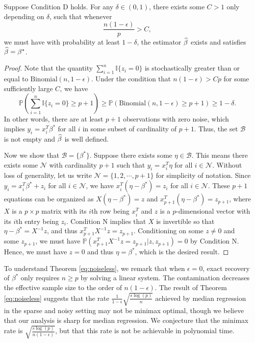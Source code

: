 \begin{thm}\label{eq:noiseless}
Suppose Condition D holds. For any $\delta\in(0,1)$, there exists some $C>1$ only depending on $\delta$, such that whenever
$$\frac{n(1-\epsilon)}{p}>C,$$
we must have with probability at least $1-\delta$, the estimator $\widehat{\beta}$ exists and satisfies $\widehat{\beta}=\beta^*$.
\end{thm}
\begin{proof}
Note that the quantity $\sum_{i=1}^n\mathbb{I}\{z_i=0\}$ is stochastically greater than or equal to $\text{Binomial}(n,1-\epsilon)$. Under the condition that $n(1-\epsilon)>Cp$ for some sufficiently large $C$, we have
$$\mathbb{P}\left(\sum_{i=1}^n\mathbb{I}\{z_i=0\}\geq p+1\right)\geq \mathbb{P}\left(\text{Binomial}(n,1-\epsilon)\geq p+1\right)\geq 1-\delta.$$
In other words, there are at least $p+1$ observations with zero noise, which implies $y_i=x_i^T\beta^*$ for all $i$ in some subset of cardinality of $p+1$. Thus, the set $\mathcal{B}$ is not empty and $\widehat{\beta}$ is well defined.

Now we show that $\mathcal{B}=\{\beta^*\}$. Suppose there exists some $\eta\in\mathcal{B}$. This means there exists some $\mathcal{N}$ with cardinality $p+1$ such that $y_i=x_i^T\eta$ for all $i\in\mathcal{N}$. Without loss of generality, let us write $\mathcal{N}=\{1,2,\cdots,p+1\}$ for simplicity of notation. Since $y_i=x_i^T\beta^*+z_i$ for all $i\in\mathcal{N}$, we have $x_i^T(\eta-\beta^*)=z_i$ for all $i\in\mathcal{N}$. These $p+1$ equations can be organized as $X(\eta-\beta^*)=z$ and $x_{p+1}^T(\eta-\beta^*)=z_{p+1}$, where $X$ is a $p\times p$ matrix with its $i$th row being $x_i^T$ and $z$ is a $p$-dimensional vector with its $i$th entry being $z_i$. Condition N implies that $X$ is invertible so that $\eta-\beta^*=X^{-1}z$, and thus $x_{p+1}^TX^{-1}z=z_{p+1}$. Conditioning on some $z\neq 0$ and some $z_{p+1}$, we must have $\mathbb{P}\left(x_{p+1}^TX^{-1}z=z_{p+1}|z,z_{p+1}\right)=0$ by Condition N. Hence, we must have $z=0$ and thus $\eta=\beta^*$, which is the desired result.
\end{proof}

To understand Theorem \ref{eq:noiseless}, we remark that when $\epsilon=0$, exact recovery of $\beta^*$ only requires $n\geq p$ by solving a linear system. The contamination decreases the effective sample size to the order of $n(1-\epsilon)$. The result of Theorem \ref{eq:noiseless} suggests that the rate $\frac{1}{1-\epsilon}\sqrt{\frac{s\log(p)}{n}}$ achieved by median regression in the sparse and noisy setting may not be minimax optimal, though we believe that our analysis is sharp for median regression. We conjecture that the minimax rate is $\sqrt{\frac{s\log(p)}{n(1-\epsilon)}}$, but that this rate is not be achievable in polynomial time.



